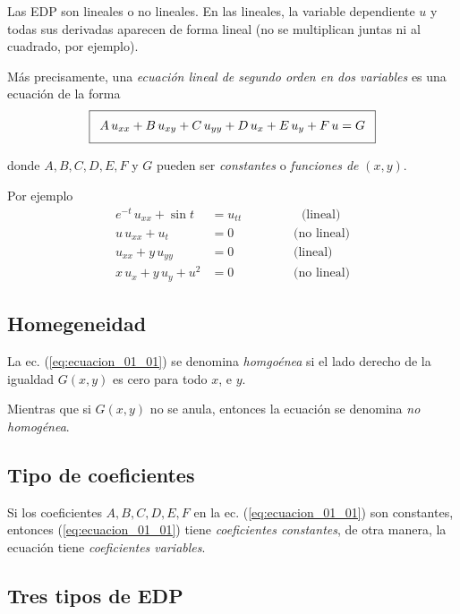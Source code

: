 Las EDP son lineales o no lineales. En las lineales, la variable dependiente $u$ y todas sus derivadas aparecen de forma lineal (no se multiplican juntas ni al cuadrado, por ejemplo).
\par
Más precisamente, una \emph{ecuación lineal de segundo orden en dos variables} es una ecuación de la forma
\begin{align}
\addtolength{\fboxsep}{5pt}\boxed{ A \, u_{xx} + B \, u_{xy} + C \, u_{yy} + D \, u_{x} + E \, u_{y} + F \, u = G}
\label{eq:ecuacion_01_01}
\end{align}

donde $A, B, C, D, E, F$ y $G$ pueden ser \emph{constantes} o \emph{funciones de} $(x, y)$.

Por ejemplo
\begin{align*}
e^{-t} \, u_{xx} + \sin t &= u_{tt} \hspace{2cm} \mbox{(lineal)} \\[0.5em] 
u \, u_{xx} + u_{t} &= 0 \hspace{2cm} \mbox{(no lineal)} \\[0.5em] 
u_{xx} + y \, u_{yy} &= 0 \hspace{2cm} \mbox{(lineal)} \\[0.5em] 
x \, u_{x} + y \, u_{y} + u^{2} &= 0 \hspace{2cm} \mbox{(no lineal)}
\end{align*}

\subsection*{Homegeneidad}

La ec. (\ref{eq:ecuacion_01_01}) se denomina \emph{homgoénea} si el lado derecho de la igualdad $G(x, y)$ es cero para todo $x$, e $y$.
\par
Mientras que si $G(x, y)$ no se anula, entonces la ecuación se denomina \emph{no homogénea}.

\subsection*{Tipo de coeficientes}

Si los coeficientes $A, B, C, D, E, F$ en la ec. (\ref{eq:ecuacion_01_01}) son constantes, entonces (\ref{eq:ecuacion_01_01}) tiene \emph{coeficientes constantes}, de otra manera, la ecuación tiene \emph{coeficientes variables}.

\subsection{Tres tipos de EDP}

